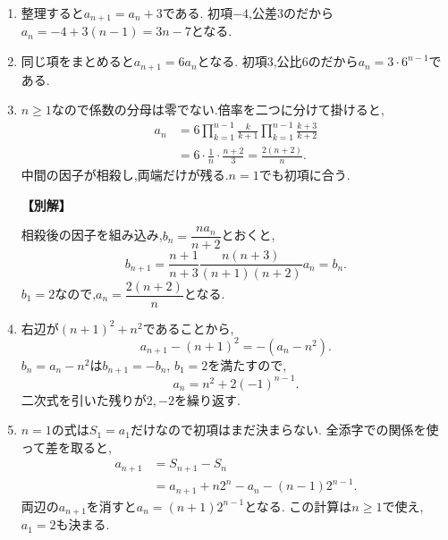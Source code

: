 \begin{enumerate}[label=\textbf{問\arabic*.},leftmargin=3.8em,format=\bookitemlink{practice-basic}{solution}{problem}]
          \item 整理すると$a_{n+1}=a_n+3$である.
                  初項$-4$,公差$3$のだから$a_n=-4+3(n-1)=3n-7$となる.

          \item 同じ項をまとめると$a_{n+1}=6a_n$となる.
                  初項$3$,公比$6$のだから$a_n=3\cdot6^{n-1}$である.

          \item $n\ge1$なので係数の分母は零でない.倍率を二つに分けて掛けると,
                  \[
                  \begin{aligned}
                    a_n&=6\prod_{k=1}^{n-1}\frac{k}{k+1}
                            \prod_{k=1}^{n-1}\frac{k+3}{k+2}\\
                       &=6\cdot\frac1n\cdot\frac{n+2}3
                        =\frac{2(n+2)}n.
                  \end{aligned}
                  \]
                  中間の因子が相殺し,両端だけが残る.$n=1$でも初項に合う.
                  \par\smallskip\noindent\textbf{【別解】}\par
                  相殺後の因子を組み込み,$b_n=\dfrac{na_n}{n+2}$とおくと,
                  \[
                    b_{n+1}=\frac{n+1}{n+3}
                      \frac{n(n+3)}{(n+1)(n+2)}a_n=b_n.
                  \]
                  $b_1=2$なので,$a_n=\dfrac{2(n+2)}{n}$となる.

          \item 右辺が$(n+1)^2+n^2$であることから,
                  \[
                    a_{n+1}-(n+1)^2=-(a_n-n^2).
                  \]
                  $b_n=a_n-n^2$は$b_{n+1}=-b_n$, $b_1=2$を満たすので,
                  \[
                    a_n=n^2+2(-1)^{n-1}.
                  \]
                  二次式を引いた残りが$2,-2$を繰り返す.

          \item $n=1$の式は$S_1=a_1$だけなので初項はまだ決まらない.
                  全添字での関係を使って差を取ると,
                  \[
                  \begin{aligned}
                    a_{n+1}&=S_{n+1}-S_n\\
                       &=a_{n+1}+n2^n-a_n-(n-1)2^{n-1}.
                  \end{aligned}
                  \]
                  両辺の$a_{n+1}$を消すと$a_n=(n+1)2^{n-1}$となる.
                  この計算は$n\ge1$で使え,$a_1=2$も決まる.


\end{enumerate}
